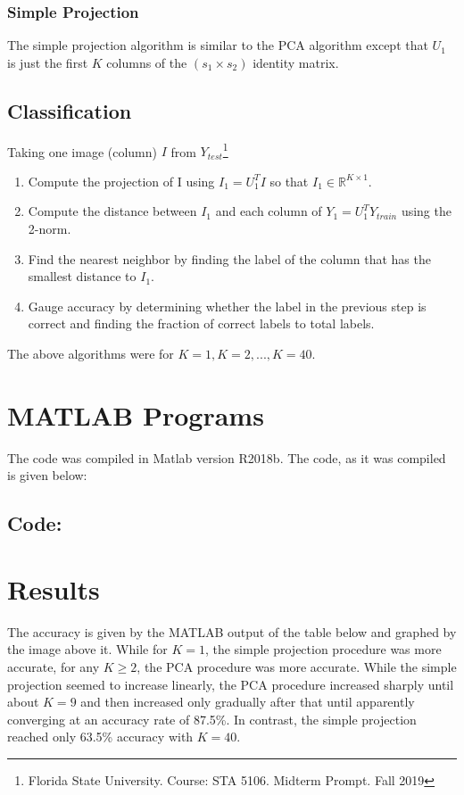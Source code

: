 \documentclass[12pt]{article}
\newcommand{\Real}{\mathbb{R}}
\begin{document}
	\subsubsection{Simple Projection}
	The simple projection algorithm is similar to the PCA algorithm except that $ U_{1} $ is just the first $ K $ columns of the $ (s_1 \times s_2) $ identity matrix. 
	
	\subsection{Classification}
	Taking one image (column) $ I $ from $ Y_{test} $\footnote{Florida State University. Course: STA 5106. Midterm Prompt. Fall 2019}
	\begin{enumerate}
		\item Compute the projection of I using $ I_1 = U_1^T I $ so that $ I_1\in \Real^{K \times 1} $.
		\item Compute the distance between $ I_1 $ and each column of $ Y_1 = U_{1}^T Y_{train} $ using the 2-norm.
		\item Find the nearest neighbor by finding the label of the column that has the smallest distance to $ I_1 $.
		\item Gauge accuracy by determining whether the label in the previous step is correct and finding the fraction of correct labels to total labels. 
	\end{enumerate}
	
	The above algorithms were for $ K=1, K=2, ..., K=40 $.
   
   
	
\section{MATLAB Programs}
	
	The code was compiled in Matlab version R2018b. The code, as it was compiled is given below:
	
	\subsection{Code:}
	
	
\section{Results}
	
	The accuracy is given by the MATLAB output of the table below and graphed by the image above it. While for $ K=1 $, the simple projection procedure was more accurate, for any $ K \geq 2 $, the PCA procedure was more accurate. While the simple projection seemed to increase linearly, the PCA procedure increased sharply until about $ K=9 $ and then increased only gradually after that until apparently converging at an accuracy rate of 87.5\%. In contrast, the simple projection reached only 63.5\% accuracy with $ K=40 $. 
	
\end{document}

